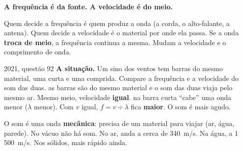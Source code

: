 \begin{minipage}[c]{0.40\linewidth}\centering
{}
\end{minipage}\hfill
\begin{minipage}[c]{0.57\linewidth}
\begin{macete}
\textbf{A frequência é da fonte. A velocidade é do meio.}\par\smallskip
Quem decide a frequência é quem produz a onda (a corda, o alto‑falante, a antena). Quem decide a velocidade é o material por onde ela passa.
Se a onda \textbf{troca de meio}, a frequência continua a mesma. Mudam a velocidade e o comprimento de onda.
\end{macete}
\end{minipage}

\begin{enemreal}{2021, questão 92}
\textbf{A situação.} Um sino dos ventos tem barras do mesmo material, uma curta e uma comprida. Compare a frequência e a
velocidade do som das duas.
 as barras são do mesmo material e o som das duas viaja pelo mesmo ar. Mesmo meio, velocidade \textbf{igual}.
 na barra curta ``cabe'' uma onda menor ($\lambda$ menor). Com $v$ igual, $f = v \div \lambda$ fica \textbf{maior}. O som é mais agudo.
\end{enemreal}


O som é uma onda \textbf{mecânica}: precisa de um material para viajar (ar, água, parede). No vácuo não há som.
No ar, anda a cerca de 340~m/s. Na água, a 1\,500~m/s. Nos sólidos, mais rápido ainda.

